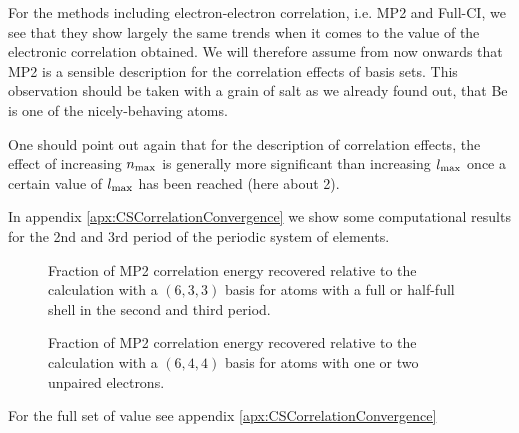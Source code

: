 For the methods including electron-electron correlation,
i.e. MP2 and Full-CI,
we see that they show largely the same trends
when it comes to the value of the electronic correlation obtained.
We will therefore assume from now onwards
that MP2 is a sensible description
for the correlation effects of \CS basis sets.
This observation should be taken with a grain
of salt
as we already found out,
that Be is one of the nicely-behaving atoms.

One should point out again that for the description
of correlation effects, the effect of increasing $n_\text{max}$
is generally more significant than increasing
$l_\text{max}$ once a certain value of $l_\text{max}$ has been reached
(here about 2).

In appendix \vref{apx:CSCorrelationConvergence} we show
some computational results for the 2nd and 3rd
period of the periodic system of elements.


\begin{figure}
	\centering
	\caption{Fraction of MP2 correlation energy recovered
		relative to the calculation with a $(6,3,3)$ \CS basis for
		atoms with a full or half-full shell in the second and third period.}
	\label{fig:EccVsNlm}
\end{figure}

\begin{figure}
	\centering
	\caption{Fraction of MP2 correlation energy recovered
		relative to the calculation with a $(6,4,4)$ \CS basis for
		atoms with one or two unpaired electrons.}
	\label{fig:EccVsNlm}
\end{figure}

For the full set of value see appendix \vref{apx:CSCorrelationConvergence}


